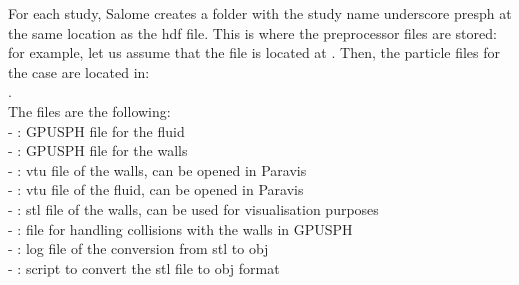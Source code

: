 \documentclass{../GPUSPHtemplate}
\begin{document}
\begin{enumerate}
\begin{itemize}
    For each study, Salome creates a folder with the study name underscore presph at the same location as the hdf file.
    This is where the preprocessor files are stored: for example, let us assume that the  file
    is located at .
    Then, the particle files for the case are located in:\\
    . \\
    The files are the following:\\
    - :  GPUSPH file for the fluid\\
    - : GPUSPH file for the walls\\
    - : vtu file of the walls, can be opened in Paravis\\
    - : vtu file of the fluid, can be opened in Paravis\\
    - : stl file of the walls, can be used for visualisation purposes\\
    - : file for handling collisions with the walls in GPUSPH\\
    - : log file of the conversion from stl to obj\\
    - : script to convert the stl file to obj format
  \end{itemize}
  

\end{enumerate}
\end{document}
